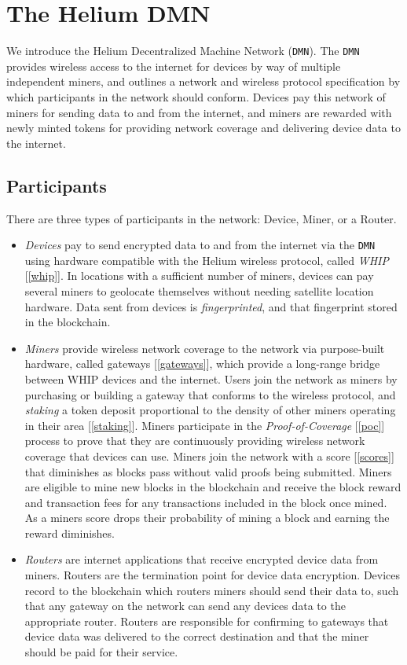 \documentclass[UTF8, 10pt, nonatbib, nocopyrightspace, reprint]{sigplanconf}
\newcommand{\secref}[1]{[\autoref{#1}]}
\begin{document}
\section{The Helium DMN}

We introduce the Helium Decentralized Machine Network (\verb|DMN|). The \verb|DMN| provides wireless access to the internet for devices by way of multiple independent miners, and outlines a network and wireless protocol specification by which participants in the network should conform. Devices pay this network of miners for sending data to and from the internet, and miners are rewarded with newly minted tokens for providing network coverage and delivering device data to the internet.

\subsection{Participants}

There are three types of participants in the network: Device, Miner, or a Router.

\begin{itemize}
    \item \emph{Devices} pay to send encrypted data to and from the internet via the \verb|DMN| using hardware compatible with the Helium wireless protocol, called \emph{WHIP} \secref{whip}. In locations with a sufficient number of miners, devices can pay several miners to geolocate themselves without needing satellite location hardware. Data sent from devices is \emph{fingerprinted}, and that fingerprint stored in the blockchain.
    \item \emph{Miners} provide wireless network coverage to the network via purpose-built hardware, called gateways \secref{gateways}, which provide a long-range bridge between WHIP devices and the internet. Users join the network as miners by purchasing or building a gateway that conforms to the wireless protocol, and \emph{staking} a token deposit proportional to the density of other miners operating in their area \secref{staking}. Miners participate in the \emph{Proof-of-Coverage} \secref{poc} process to prove that they are continuously providing wireless network coverage that devices can use. Miners join the network with a score \secref{scores} that diminishes as blocks pass without valid proofs being submitted. Miners are eligible to mine new blocks in the blockchain and receive the block reward and transaction fees for any transactions included in the block once mined. As a miners score drops their probability of mining a block and earning the reward diminishes.
    \item \emph{Routers} are internet applications that receive encrypted device data from miners. Routers are the termination point for device data encryption. Devices record to the blockchain which routers miners should send their data to, such that any gateway on the network can send any devices data to the appropriate router. Routers are responsible for confirming to gateways that device data was delivered to the correct destination and that the miner should be paid for their service.
\end{itemize}
\end{document}
